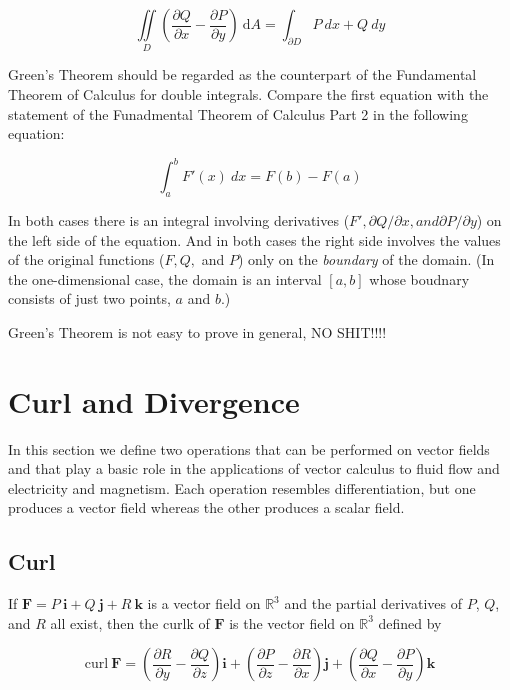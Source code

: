 \documentclass{article}
\begin{document}
\begin{equation*}
    \iint\limits_{D}(\frac{\partial Q}{\partial x} - \frac{\partial P}{\partial y}) \ \mathrm{d}A = \int_{\partial D} P \ dx + Q \ dy
\end{equation*}

Green's Theorem should be regarded as the counterpart of the Fundamental Theorem of Calculus for double integrals. Compare the first equation with the statement of the Funadmental Theorem of Calculus Part 2 in the following equation:

\begin{equation*}
    \int_{a}^{b}F'(x) \ dx = F(b) - F(a)
\end{equation*}

In both cases there is an integral involving derivatives ($F', \partial Q / \partial x, and \partial P / \partial y$) on the left side of the equation. And in both cases the right side involves the values of the original functions ($F, Q,$ and $P$) only on the \textit{boundary} of the domain. (In the one-dimensional case, the domain is an interval $[a,b]$ whose boudnary consists of just two points, $a$ and $b.$)

Green's Theorem is not easy to prove in general, NO SHIT!!!!


\newpage
\section{Curl and Divergence}

In this section we define two operations that can be performed on vector fields and that play a basic role in the applications of vector calculus to fluid flow and electricity and magnetism. Each operation resembles differentiation, but one produces a vector field whereas the other produces a scalar field.

\subsection{Curl}

If $\mathbf{F} = P \ \mathbf{i} + Q \ \mathbf{j} + R \  \mathbf{k}$ is a vector field on $\mathbb{R}^3$ and the partial derivatives of $P$, $Q$, and $R$ all exist, then the curlk of $\mathbf{F}$ is the vector field on $\mathbb{R}^3$ defined by 

\begin{equation*}
    \text{curl} \ \mathbf{F} = (\frac{\partial R}{\partial y} - \frac{\partial Q}{\partial z}) \mathbf{i} + (\frac{\partial P}{\partial z} - \frac{\partial R}{\partial x}) \mathbf{j} + (\frac{\partial Q}{\partial x} - \frac{\partial P}{\partial y}) \mathbf{k}
\end{equation*}
\end{document}
